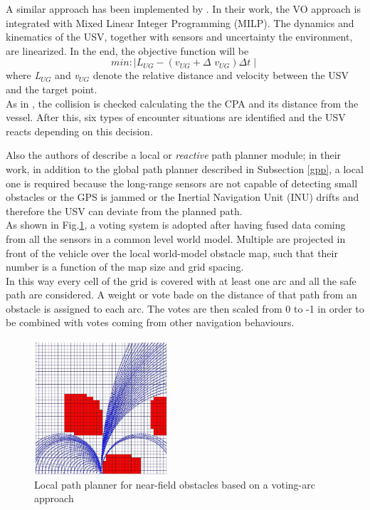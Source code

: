 \documentclass[12pt]{article}
\begin{document}
              \indent A similar approach has been implemented by \textcite{Leng2013}. In their work, the VO approach is integrated with Mixed Linear Integer Programming (MILP). The dynamics and kinematics of the USV, together with sensors and uncertainty the environment, are linearized. In the end, the objective function will be
                  \begin{equation} \label{eq:milp}
                    min:  \mid  \textit{L$_{UG}$} - (\textit{v$_{UG}$} + \textit{$\Delta$ v$_{UG}$}) \Delta t \mid
                  \end{equation}
              where \textit{L$_{UG}$} and \textit{v$_{UG}$} denote the relative distance and velocity between the USV and the target point.\\
              As in \parencite{Kuwata2014}, the collision is checked calculating the the CPA and its distance from the vessel. After this, six types of encounter situations are identified and the USV reacts depending on this decision.

              \indent Also the authors of \parencite{Larson2007,Larson2007a} describe a local or \textit{reactive} path planner module; in their work, in addition to the global path planner described in Subsection \ref{gpp}, a local one is required because the long-range sensors are not capable of detecting small obstacles or the GPS is jammed or the Inertial Navigation Unit (INU) drifts and therefore the USV can deviate from the planned path. \\
              As shown in Fig.\ref{fig:arcs}, a voting system is adopted after having fused data coming from all the sensors in a common level world model. Multiple are projected in front of the vehicle over the local world-model obstacle map, such that their number is a function of the map size and grid spacing. \\
              In this way every cell of the grid is covered with at least one arc and all the safe path are considered. A weight or vote bade on the distance of that path from an obstacle is assigned to each arc. The votes are then scaled from 0 to -1 in order to be combined with votes coming from other navigation behaviours.

              \begin{figure}
                    \centering
                    \includegraphics[height=5cm]{./Images/Larson/arcs}
                    \caption{Local path planner for near-field obstacles based on a voting-arc approach}
                    \label{fig:arcs}
              \end{figure}
\end{document}
